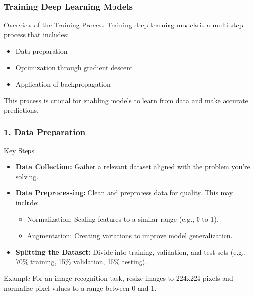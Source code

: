 \documentclass[aspectratio=169]{beamer}
\begin{document}
\begin{frame}[fragile]
    \frametitle{Training Deep Learning Models}
    \begin{block}{Overview of the Training Process}
        Training deep learning models is a multi-step process that includes:
        \begin{itemize}
            \item Data preparation
            \item Optimization through gradient descent
            \item Application of backpropagation
        \end{itemize}
        This process is crucial for enabling models to learn from data and make accurate predictions.
    \end{block}
\end{frame}

\begin{frame}[fragile]
    \frametitle{1. Data Preparation}
    \begin{block}{Key Steps}
        \begin{itemize}
            \item \textbf{Data Collection:} Gather a relevant dataset aligned with the problem you're solving.
            \item \textbf{Data Preprocessing:} Clean and preprocess data for quality. This may include:
            \begin{itemize}
                \item Normalization: Scaling features to a similar range (e.g., 0 to 1).
                \item Augmentation: Creating variations to improve model generalization.
            \end{itemize}
            \item \textbf{Splitting the Dataset:} Divide into training, validation, and test sets (e.g., 70\% training, 15\% validation, 15\% testing).
        \end{itemize}
    \end{block}
    \begin{block}{Example}
        For an image recognition task, resize images to 224x224 pixels and normalize pixel values to a range between 0 and 1.
    \end{block}
\end{frame}
\end{document}
